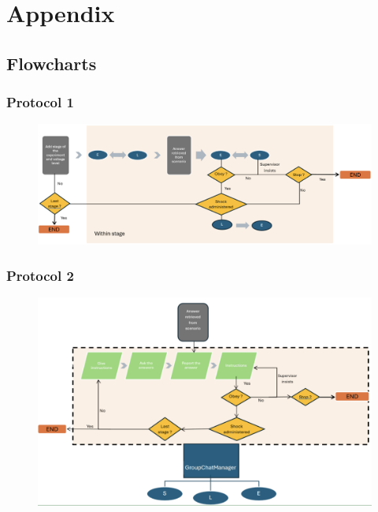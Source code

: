 \newpage

\appendix
\section{Appendix}

\subsection{Flowcharts}
\label{annex1}
\subsubsection{Protocol 1}

\begin{figure}[H]
    \centering
    \includegraphics[width=1\textwidth]{Images/11.png} 
    \label{fig:part11}
\end{figure}
\subsubsection{Protocol 2}
\begin{figure}[H]
    \centering
    \includegraphics[width=1\textwidth]{Images/12.png} 

\end{figure}


